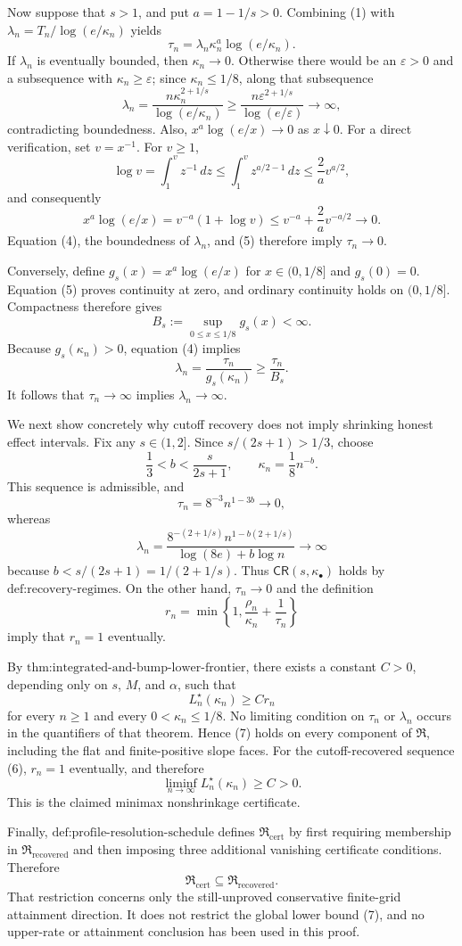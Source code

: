 Now suppose that \(s>1\), and put \(a=1-1/s>0\).  Combining (1) with \(\lambda_n=T_n/\log(e/\kappa_n)\) yields
\[
 \tau_n
 =\lambda_n\kappa_n^a\log(e/\kappa_n).
 \tag{4}
\]
If \(\lambda_n\) is eventually bounded, then \(\kappa_n\to0\).  Otherwise there would be an \(\varepsilon>0\) and a subsequence with \(\kappa_n\ge\varepsilon\); since \(\kappa_n\le1/8\), along that subsequence
\[
 \lambda_n
 =\frac{n\kappa_n^{2+1/s}}{\log(e/\kappa_n)}
 \ge
 \frac{n\varepsilon^{2+1/s}}{\log(e/\varepsilon)}
 \longrightarrow\infty,
\]
contradicting boundedness.  Also, \(x^a\log(e/x)\to0\) as \(x\downarrow0\).  For a direct verification, set \(v=x^{-1}\).  For \(v\ge1\),
\[
 \log v=\int_1^v z^{-1}\,dz
 \le\int_1^v z^{a/2-1}\,dz
 \le\frac{2}{a}v^{a/2},
\]
and consequently
\[
 x^a\log(e/x)
 =v^{-a}(1+\log v)
 \le v^{-a}+\frac{2}{a}v^{-a/2}\longrightarrow0.
 \tag{5}
\]
Equation (4), the boundedness of \(\lambda_n\), and (5) therefore imply \(\tau_n\to0\).

Conversely, define \(g_s(x)=x^a\log(e/x)\) for \(x\in(0,1/8]\) and \(g_s(0)=0\).  Equation (5) proves continuity at zero, and ordinary continuity holds on \((0,1/8]\).  Compactness therefore gives
\[
 B_s:=\sup_{0\le x\le1/8}g_s(x)<\infty.
\]
Because \(g_s(\kappa_n)>0\), equation (4) implies
\[
 \lambda_n=\frac{\tau_n}{g_s(\kappa_n)}
 \ge\frac{\tau_n}{B_s}.
\]
It follows that \(\tau_n\to\infty\) implies \(\lambda_n\to\infty\).

We next show concretely why cutoff recovery does not imply shrinking honest effect intervals.  Fix any \(s\in(1,2]\).  Since \(s/(2s+1)>1/3\), choose
\[
 \frac13<b<\frac{s}{2s+1},
 \qquad
 \kappa_n=\frac18 n^{-b}.
 \tag{6}
\]
This sequence is admissible, and
\[
 \tau_n=8^{-3}n^{1-3b}\longrightarrow0,
\]
whereas
\[
 \lambda_n
 =\frac{8^{-(2+1/s)}n^{1-b(2+1/s)}}{\log(8e)+b\log n}
 \longrightarrow\infty
\]
because \(b<s/(2s+1)=1/(2+1/s)\).  Thus \(\mathsf{CR}(s,\kappa_\bullet)\) holds by \(\text{def:recovery-regimes}\).  On the other hand, \(\tau_n\to0\) and the definition
\[
 r_n=\min\left\{1,\frac{\rho_n}{\kappa_n}+\frac{1}{\tau_n}\right\}
\]
imply that \(r_n=1\) eventually.

By \(\text{thm:integrated-and-bump-lower-frontier}\), there exists a constant \(C>0\), depending only on \(s\), \(M\), and \(\alpha\), such that
\[
 L_n^\star(\kappa_n)\ge C r_n
 \tag{7}
\]
for every \(n\ge1\) and every \(0<\kappa_n\le1/8\).  No limiting condition on \(\tau_n\) or \(\lambda_n\) occurs in the quantifiers of that theorem.  Hence (7) holds on every component of \(\mathfrak R\), including the flat and finite-positive slope faces.  For the cutoff-recovered sequence (6), \(r_n=1\) eventually, and therefore
\[
 \liminf_{n\to\infty}L_n^\star(\kappa_n)\ge C>0.
\]
This is the claimed minimax nonshrinkage certificate.

Finally, \(\text{def:profile-resolution-schedule}\) defines \(\mathfrak R_{\mathrm{cert}}\) by first requiring membership in \(\mathfrak R_{\mathrm{recovered}}\) and then imposing three additional vanishing certificate conditions.  Therefore
\[
 \mathfrak R_{\mathrm{cert}}\subseteq\mathfrak R_{\mathrm{recovered}}.
\]
That restriction concerns only the still-unproved conservative finite-grid attainment direction.  It does not restrict the global lower bound (7), and no upper-rate or attainment conclusion has been used in this proof.
